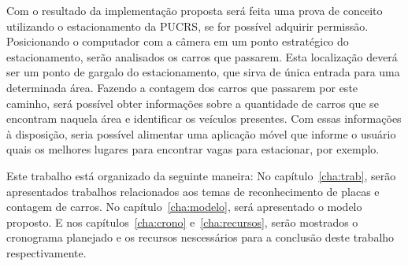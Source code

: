 Com o resultado da implementação proposta será feita uma prova de conceito utilizando o estacionamento da
PUCRS, se for possível adquirir permissão. Posicionando o computador com a câmera em um ponto estratégico 
do estacionamento, serão analisados os carros que passarem. Esta localização deverá ser um ponto de gargalo
do estacionamento, que sirva de única entrada para uma determinada área. Fazendo a contagem dos carros que
passarem por este caminho, será possível obter informações sobre a quantidade de carros que se encontram
naquela área e identificar os veículos presentes. Com essas informações à disposição, seria possível alimentar
uma aplicação móvel que informe o usuário quais os melhores lugares para encontrar vagas para estacionar, por 
exemplo.

Este trabalho está organizado da seguinte maneira: No capítulo~\ref{cha:trab},
serão apresentados trabalhos relacionados aos temas de reconhecimento de placas
e contagem de carros. No capítulo~\ref{cha:modelo}, será apresentado o modelo
proposto. E nos capítulos~\ref{cha:crono}  e~\ref{cha:recursos}, serão mostrados
o cronograma planejado e os recursos nescessários para a conclusão deste
trabalho respectivamente.

